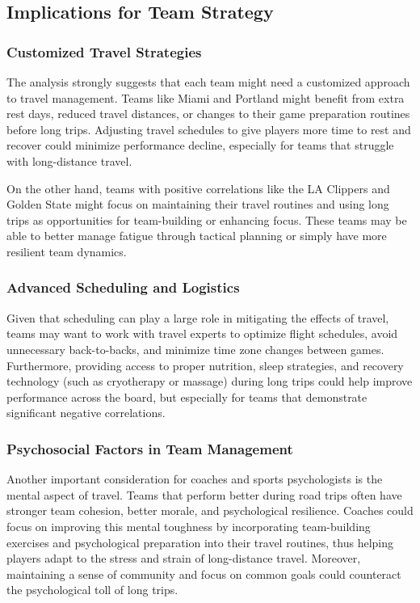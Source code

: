 \documentclass[12pt]{article}
\begin{document}
\subsection{Implications for Team Strategy}
\subsubsection{Customized Travel Strategies}
The analysis strongly suggests that each team might need a customized approach to travel management. Teams like Miami and Portland might benefit from extra rest days, reduced travel distances, or changes to their game preparation routines before long trips. Adjusting travel schedules to give players more time to rest and recover could minimize performance decline, especially for teams that struggle with long-distance travel.

On the other hand, teams with positive correlations like the LA Clippers and Golden State might focus on maintaining their travel routines and using long trips as opportunities for team-building or enhancing focus. These teams may be able to better manage fatigue through tactical planning or simply have more resilient team dynamics.

\subsubsection{Advanced Scheduling and Logistics}
Given that scheduling can play a large role in mitigating the effects of travel, teams may want to work with travel experts to optimize flight schedules, avoid unnecessary back-to-backs, and minimize time zone changes between games. Furthermore, providing access to proper nutrition, sleep strategies, and recovery technology (such as cryotherapy or massage) during long trips could help improve performance across the board, but especially for teams that demonstrate significant negative correlations.

\subsubsection{Psychosocial Factors in Team Management}
Another important consideration for coaches and sports psychologists is the mental aspect of travel. Teams that perform better during road trips often have stronger team cohesion, better morale, and psychological resilience. Coaches could focus on improving this mental toughness by incorporating team-building exercises and psychological preparation into their travel routines, thus helping players adapt to the stress and strain of long-distance travel. Moreover, maintaining a sense of community and focus on common goals could counteract the psychological toll of long trips.
\end{document}
